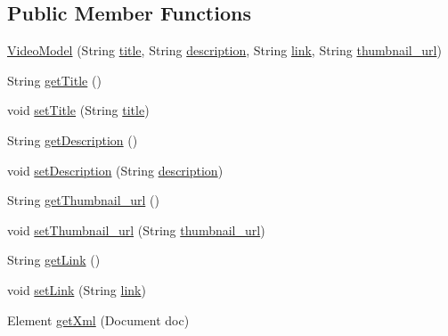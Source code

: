 \subsection*{Public Member Functions}
\begin{DoxyCompactItemize}
\item 
\hyperlink{classorg_1_1buildmlearn_1_1toolkit_1_1templates_1_1VideoModel_a72a54be0117bf5693d0309ba9efb0d5b}{Video\+Model} (String \hyperlink{classorg_1_1buildmlearn_1_1toolkit_1_1templates_1_1VideoModel_a9c4cb7a2202cf993149e8fc5b46281da}{title}, String \hyperlink{classorg_1_1buildmlearn_1_1toolkit_1_1templates_1_1VideoModel_a7ad4b4bcca9e5f886e109f1e316eb76b}{description}, String \hyperlink{classorg_1_1buildmlearn_1_1toolkit_1_1templates_1_1VideoModel_a5ea9218247c35394a88dbc5c477e482c}{link}, String \hyperlink{classorg_1_1buildmlearn_1_1toolkit_1_1templates_1_1VideoModel_a8d4c0cecc8dca7168361462f629adb9f}{thumbnail\+\_\+url})
\item 
String \hyperlink{classorg_1_1buildmlearn_1_1toolkit_1_1templates_1_1VideoModel_a6ec69ddb83bf8b52bf179ef893465d3a}{get\+Title} ()
\item 
void \hyperlink{classorg_1_1buildmlearn_1_1toolkit_1_1templates_1_1VideoModel_afeddf7eabdf89597e8faec0d8440837d}{set\+Title} (String \hyperlink{classorg_1_1buildmlearn_1_1toolkit_1_1templates_1_1VideoModel_a9c4cb7a2202cf993149e8fc5b46281da}{title})
\item 
String \hyperlink{classorg_1_1buildmlearn_1_1toolkit_1_1templates_1_1VideoModel_aabfaa4b7a0318cc65d8297f66c6aa95b}{get\+Description} ()
\item 
void \hyperlink{classorg_1_1buildmlearn_1_1toolkit_1_1templates_1_1VideoModel_adee64777cc75cc504543c0cd17318199}{set\+Description} (String \hyperlink{classorg_1_1buildmlearn_1_1toolkit_1_1templates_1_1VideoModel_a7ad4b4bcca9e5f886e109f1e316eb76b}{description})
\item 
String \hyperlink{classorg_1_1buildmlearn_1_1toolkit_1_1templates_1_1VideoModel_a55219474696eef191d743de460ec244f}{get\+Thumbnail\+\_\+url} ()
\item 
void \hyperlink{classorg_1_1buildmlearn_1_1toolkit_1_1templates_1_1VideoModel_a36d31fecc31acad828f64056a7834ba0}{set\+Thumbnail\+\_\+url} (String \hyperlink{classorg_1_1buildmlearn_1_1toolkit_1_1templates_1_1VideoModel_a8d4c0cecc8dca7168361462f629adb9f}{thumbnail\+\_\+url})
\item 
String \hyperlink{classorg_1_1buildmlearn_1_1toolkit_1_1templates_1_1VideoModel_ab8b011b8c4282f948e1e4ca47b326fc5}{get\+Link} ()
\item 
void \hyperlink{classorg_1_1buildmlearn_1_1toolkit_1_1templates_1_1VideoModel_a0a6b50f459b6a18de72b9e1e04280fcc}{set\+Link} (String \hyperlink{classorg_1_1buildmlearn_1_1toolkit_1_1templates_1_1VideoModel_a5ea9218247c35394a88dbc5c477e482c}{link})
\item 
Element \hyperlink{classorg_1_1buildmlearn_1_1toolkit_1_1templates_1_1VideoModel_afb954fab3cde6b5fda5f3e8a8d6f0ec5}{get\+Xml} (Document doc)
\end{DoxyCompactItemize}
